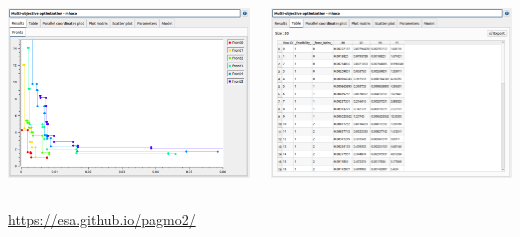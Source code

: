 \documentclass[aspectratio=169]{beamer}
\begin{document}
\begin{frame}
\begin{columns}
    \begin{center}
      \includegraphics[width=\textwidth]{figures/pareto_front.png}
    \end{center}

    \begin{center}
      \includegraphics[width=\textwidth]{figures/moResults.png}
    \end{center}

  \end{columns}
  \begin{center}
    \vfill
    \tiny{\url{https://esa.github.io/pagmo2/}}
  \end{center}
\end{frame}
\end{document}
